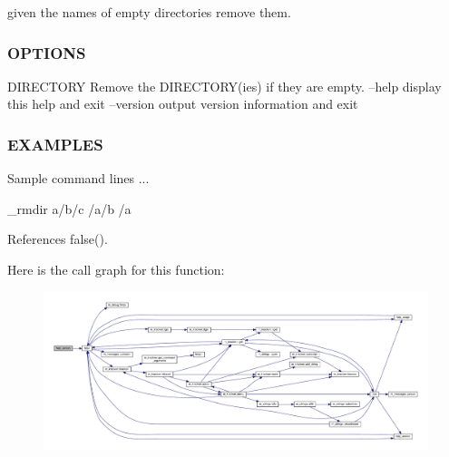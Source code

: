 given the names of empty directories remove them. \subsubsection*{O\+P\+T\+I\+O\+NS}

D\+I\+R\+E\+C\+T\+O\+RY Remove the D\+I\+R\+E\+C\+T\+O\+R\+Y(ies) if they are empty. --help display this help and exit --version output version information and exit \subsubsection*{E\+X\+A\+M\+P\+L\+ES}

Sample command lines ... \begin{DoxyVerb}   _rmdir a/b/c /a/b /a \end{DoxyVerb}
 

References false().

Here is the call graph for this function\+:
\nopagebreak
\begin{figure}[H]
\begin{center}
\leavevmode
\includegraphics[width=350pt]{__rmdir_8f90_a39c21619b08a3c22f19e2306efd7f766_cgraph}
\end{center}
\end{figure}
